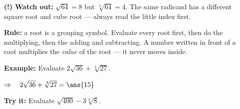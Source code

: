 \documentclass[12pt]{article}
\begin{document}
\begin{watchoutbox}
\textbf{(!) Watch out:} $\sqrt{64} = 8$ but $\sqrt[3]{64} = 4$. The same radicand has a
different square root and cube root --- always read the little index first.
\end{watchoutbox}


\begin{formulabox}
\textbf{Rule:} a root is a grouping symbol. Evaluate every root first, then do the
multiplying, then the adding and subtracting. A number written in front of a root
multiplies the \emph{value} of the root --- it never moves inside.
\end{formulabox}

\begin{examplebox}
\textbf{Example:} \quad Evaluate $2\sqrt{36} + \sqrt[3]{27}$.

$\Rightarrow\quad 2\sqrt{36} + \sqrt[3]{27} = \ans{15}$
\end{examplebox}

\begin{tryitbox}
\textbf{Try it:} \quad Evaluate $\sqrt{400} - 3\sqrt[3]{8}$.\\[2pt]
\end{tryitbox}
\end{document}

